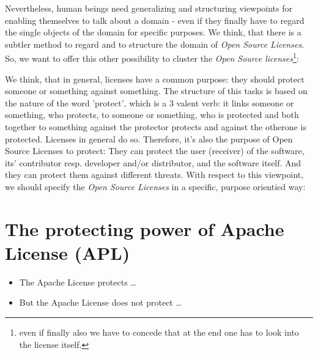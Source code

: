 Nevertheless, human beings need generalizing and structuring viewpoints for
enabling themselves to talk about a domain - even if they finally have to regard
the single objects of the domain for specific purposes. We think, that there is
a subtler method to regard and to structure the domain of \emph{Open Source
Licenses}. So, we want to offer this other possibility to cluster the \emph{Open
Source licenses}\footnote{even if finally also we have to concede that at the
end one has to look into the license itself.}:

We think, that in general, licenses have a common purpose: they should protect
someone or something against something. The structure of this tasks is based on
the nature of the word 'protect', which is a 3 valent verb: it links someone or
something, who protects, to someone or something, who is protected and both
together to something against the protector protects and against the otherone is
protected. Licenses in general do so. Therefore, it's also the purpose of Open
Source Licenses to protect: They can protect the user (receiver) of the
software, its' contributor resp. developer and/or distributor, and the software
itself. And they can protect them against different threats. With respect to
this viewpoint, we should specify the \emph{Open Source Licenses} in a specific,
purpose orientied way:

\section{The protecting power of Apache License (APL)}
\begin{itemize} 
  \item The Apache License protects \ldots
  \item But the Apache License does not protect \ldots
\end{itemize}

